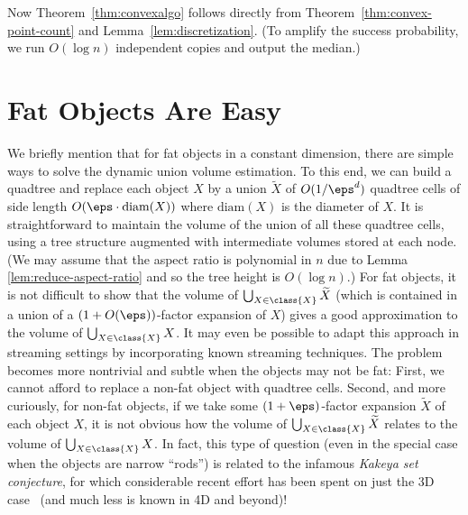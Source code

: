 %
Now Theorem~\ref{thm:convexalgo} follows directly from Theorem~\ref{thm:convex-point-count} and Lemma~\ref{lem:discretization}. (To amplify the success probability, we run $O(\log n)$ independent copies and output the median.)
%
%
\appendix
%
\section{Fat Objects Are Easy}
\label{sec:fat}
%
We briefly mention that for fat objects in a constant dimension, there are simple ways to solve the dynamic union volume estimation. To this end, we can build a quadtree and replace each object $X$ by a union $\widetilde{X}$ of $O(1/\eps^d)$ quadtree cells of side length $O(\eps \cdot \mathrm{diam}(X))$ where $\mathrm{diam}(X)$ is the diameter of $X$.  It is straightforward to maintain the volume of the union of all these quadtree cells, using a tree structure augmented with intermediate volumes stored at each node. (We may assume that the aspect ratio is polynomial in $n$ due to Lemma \ref{lem:reduce-aspect-ratio} and so the tree height is $O(\log n)$.)
%
For fat objects, it is not difficult to show that the volume of $\bigcup_{X\in \class{X}} \widetilde{X}$ (which is contained in a union of a $(1+O(\eps))$-factor expansion of $X$) gives a good approximation to the volume of $\bigcup_{X \in \class{X}} X$.
It may even be possible to adapt this approach in streaming settings by incorporating known streaming techniques.  
%
The problem becomes more nontrivial and subtle when the objects may not be fat: First, we cannot afford to replace a non-fat object with quadtree cells. Second, and more curiously, for non-fat objects, if we take some $(1+\eps)$-factor expansion $\widetilde{X}$ of each object $X$, it is not obvious how the volume of $\bigcup_{X\in \class{X}}\widetilde{X}$ relates to the volume of $\bigcup_{X\in \class{X}} X$.  In fact, this type of question (even in the special case when the objects are narrow ``rods'') is related to the infamous \emph{Kakeya set conjecture}, for which considerable recent effort has been spent on just the 3D case~\cite{WangZ25} (and much less is known in 4D and beyond)!
%
